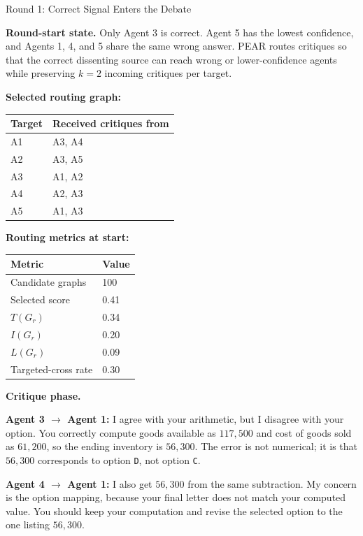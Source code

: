 \begin{roundbox}{Round 1: Correct Signal Enters the Debate}

\textbf{Round-start state.} Only Agent 3 is correct. Agent 5 has the lowest confidence, and Agents 1, 4, and 5 share the same wrong answer. PEAR routes critiques so that the correct dissenting source can reach wrong or lower-confidence agents while preserving $k=2$ incoming critiques per target.

\vspace{1mm}
\textbf{Selected routing graph:}
\begin{center}
\footnotesize
\begin{tabular}{@{}ll@{}}
\toprule
Target & Received critiques from \\
\midrule
A1 & A3, A4 \\
A2 & A3, A5 \\
A3 & A1, A2 \\
A4 & A2, A3 \\
A5 & A1, A3 \\
\bottomrule
\end{tabular}
\end{center}

\textbf{Routing metrics at start:}
\begin{center}
\footnotesize
\begin{tabular}{@{}ll@{}}
\toprule
Metric & Value \\
\midrule
Candidate graphs & 100 \\
Selected score & 0.41 \\
$T(G_r)$ & 0.34 \\
$I(G_r)$ & 0.20 \\
$L(G_r)$ & 0.09 \\
Targeted-cross rate & 0.30 \\
\bottomrule
\end{tabular}
\end{center}

\textbf{Critique phase.}

\textbf{Agent 3 $\rightarrow$ Agent 1:} I agree with your arithmetic, but I disagree with your option. You correctly compute goods available as $117{,}500$ and cost of goods sold as $61{,}200$, so the ending inventory is $56{,}300$. The error is not numerical; it is that $56{,}300$ corresponds to option \texttt{D}, not option \texttt{C}.

\textbf{Agent 4 $\rightarrow$ Agent 1:} I also get $56{,}300$ from the same subtraction. My concern is the option mapping, because your final letter does not match your computed value. You should keep your computation and revise the selected option to the one listing $56{,}300$.


\end{roundbox}
